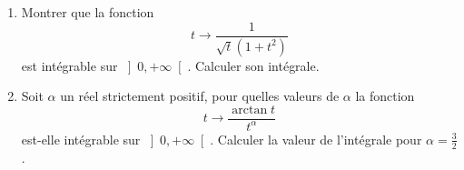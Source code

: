 \begin{enumerate}
\item  Montrer que la fonction
\[
t\rightarrow \frac{1}{\sqrt{t}(1+t^{2})}
\]
est int{\'e}grable sur $\left] 0,+\infty \right[ $. Calculer son
int{\'e}grale.

\item  Soit $\alpha $ un r{\'e}el strictement positif, pour quelles valeurs
de $\alpha $ la fonction
\[
t\rightarrow \frac{\arctan t}{t^{\alpha }}
\]
est-elle int{\'e}grable sur $\left] 0,+\infty \right[ $. Calculer la
valeur de l'int{\'e}grale pour $\alpha =\frac{3}{2}$.
\end{enumerate}
